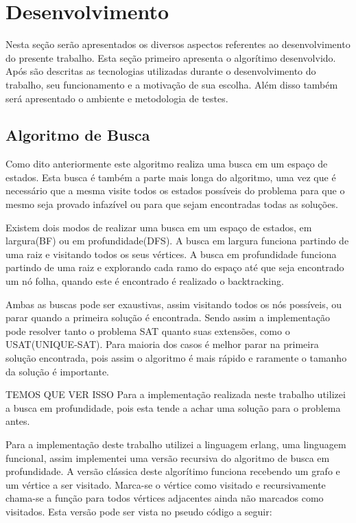 \documentclass{ufsc-thesis}
\begin{document}
\chapter{Desenvolvimento}

Nesta seção serão apresentados os diversos aspectos referentes ao desenvolvimento
do presente trabalho. Esta seção primeiro apresenta o algorítimo desenvolvido. Após são 
descritas as tecnologias utilizadas durante o desenvolvimento do trabalho, seu 
funcionamento e a motivação de sua escolha. Além disso também será apresentado o ambiente 
e metodologia de testes.

\section{Algoritmo de Busca}

Como dito anteriormente este algoritmo realiza uma busca em um espaço de estados. Esta busca 
é também a parte mais longa do algoritmo, uma vez que é necessário que a mesma visite todos os
estados possíveis do problema para que o mesmo seja provado infazível ou para que sejam encontradas 
todas as soluções.

Existem dois modos de realizar uma busca em um espaço de estados, em largura(BF) ou em profundidade(DFS). 
A busca em largura funciona partindo de uma raiz e visitando todos os seus vértices. A busca em profundidade 
funciona partindo de uma raiz e explorando cada ramo do espaço até que seja encontrado um nó folha, 
quando este é encontrado é realizado o backtracking.

Ambas as buscas pode ser exaustivas, assim visitando todos os nós possíveis, ou parar quando a primeira 
solução é encontrada. Sendo assim a implementação pode resolver tanto o problema SAT quanto suas 
extensões, como o USAT(UNIQUE-SAT). Para maioria dos casos é melhor parar na primeira solução encontrada, 
pois assim o algoritmo é mais rápido e raramente o tamanho da solução é importante.

TEMOS QUE VER ISSO
Para a implementação realizada neste trabalho utilizei a busca em profundidade, pois esta tende a achar 
uma solução para o problema antes.

Para a implementação deste trabalho utilizei a linguagem erlang, uma linguagem funcional, assim implementei 
uma versão recursiva do algoritmo de busca em profundidade. A versão clássica deste algorítimo funciona 
recebendo um grafo e um vértice a ser visitado. Marca-se o vértice como visitado e recursivamente chama-se 
a função para todos vértices adjacentes ainda não marcados como visitados. Esta versão pode ser vista no
pseudo código a seguir:
\end{document}
